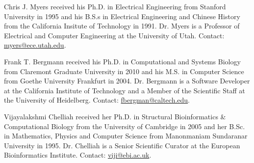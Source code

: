 \documentclass[journal,transmag]{IEEEtran}
\begin{document}
\begin{IEEEbiography}{Chris J. Myers}
received his Ph.D. in Electrical Engineering from Stanford University in 1995 and his B.S.s in Electrical Engineering and Chinese History from the California Insitute of Technology in 1991.
Dr. Myers is a Professor of Electrical and Computer Engineering at the University of Utah.
Contact: \href{mailto:myers@ece.utah.edu}{myers@ece.utah.edu}.
\end{IEEEbiography}

\begin{IEEEbiography}{Frank T. Bergmann}
received his Ph.D. in Computational and Systems Biology from Claremont Graduate University in 2010 and his M.S. in Computer Science from Goethe University Frankfurt in 2004.
Dr. Bergmann is a Software Developer at the California Institute of Technology and a Member of the Scientific Staff at the University of Heidelberg.
Contact: \href{mailto:fbergman@caltech.edu}{fbergman@caltech.edu}.
\end{IEEEbiography}

\begin{IEEEbiography}{Vijayalakshmi Chelliah}
received her Ph.D. in Structural Bioinformatics \& Computational Biology from the University of Cambridge in 2005 and her B.Sc. in Mathematics, Physics and Computer Science from Manonmaniam Sundaranar University in 1995.
Dr. Chelliah is a Senior Scientific Curator at the European Bioinformatics Institute.
Contact: \href{mailto:viji@ebi.ac.uk}{viji@ebi.ac.uk}.
\end{IEEEbiography}
\end{document}
